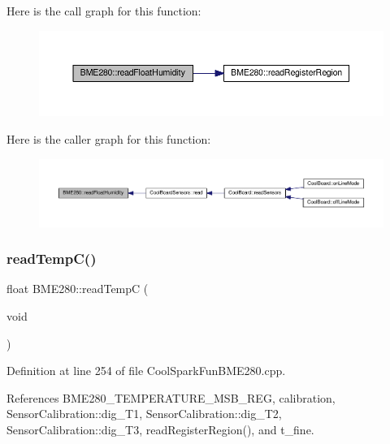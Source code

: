 Here is the call graph for this function\+:
\nopagebreak
\begin{figure}[H]
\begin{center}
\leavevmode
\includegraphics[width=350pt]{df/dcf/class_b_m_e280_a42ea7232039eebf5aadb391ef6132c35_cgraph}
\end{center}
\end{figure}
Here is the caller graph for this function\+:\nopagebreak
\begin{figure}[H]
\begin{center}
\leavevmode
\includegraphics[width=350pt]{df/dcf/class_b_m_e280_a42ea7232039eebf5aadb391ef6132c35_icgraph}
\end{center}
\end{figure}
\mbox{\label{class_b_m_e280_afffdd1d7ded9e1f92200e70669019d97}} 
\subsubsection{\texorpdfstring{read\+Temp\+C()}{readTempC()}}
{\footnotesize\ttfamily float B\+M\+E280\+::read\+TempC (\begin{DoxyParamCaption}\item[{void}]{ }\end{DoxyParamCaption})}



Definition at line 254 of file Cool\+Spark\+Fun\+B\+M\+E280.\+cpp.



References B\+M\+E280\+\_\+\+T\+E\+M\+P\+E\+R\+A\+T\+U\+R\+E\+\_\+\+M\+S\+B\+\_\+\+R\+EG, calibration, Sensor\+Calibration\+::dig\+\_\+\+T1, Sensor\+Calibration\+::dig\+\_\+\+T2, Sensor\+Calibration\+::dig\+\_\+\+T3, read\+Register\+Region(), and t\+\_\+fine.



